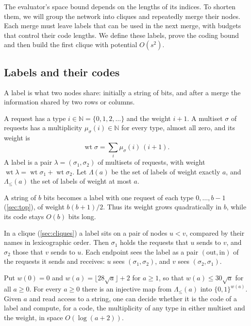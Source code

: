 \documentclass[11pt]{article}
\theoremstyle{definition}
\theoremstyle{definition}
\theoremstyle{remark}
\newcommand{\N}{\mathbb{N}}
\newcommand{\wt}{\operatorname{wt}}
\newcommand{\out}{\mathrm{out}}
\newcommand{\inn}{\mathrm{in}}
\begin{document}
The evaluator's space bound depends on the lengths of its indices. To shorten them, we will group the network into cliques and repeatedly merge their nodes. Each merge must leave labels that can be used in the next merge, with budgets that control their code lengths. We define these labels, prove the coding bound and then build the first clique with potential $O(s^2)$.

\subsection{Labels and their codes}

A label is what two nodes share: initially a string of bits, and after a merge the information shared by two rows or columns.

A request has a type $i\in\N=\{0,1,2,\dots\}$ and the weight $i+1$. A multiset $\sigma$ of requests has a multiplicity $\mu_\sigma(i)\in\N$ for every type, almost all zero, and its weight is
\[
\wt\sigma=\sum_i\mu_\sigma(i)\,(i+1).
\]
A label is a pair $\lambda=(\sigma_1,\sigma_2)$ of multisets of requests, with weight $\wt\lambda=\wt\sigma_1+\wt\sigma_2$. Let $\Lambda(a)$ be the set of labels of weight exactly $a$, and $\Lambda_{\le}(a)$ the set of labels of weight at most $a$.

A string of $b$ bits becomes a label with one request of each type $0,\dots,b-1$ (\cref{sec:top}), of weight $b(b+1)/2$. Thus its weight grows quadratically in $b$, while its code stays $O(b)$ bits long.

In a clique (\cref{sec:cliques}) a label sits on a pair of nodes $u<v$, compared by their names in lexicographic order. Then $\sigma_1$ holds the requests that $u$ sends to $v$, and $\sigma_2$ those that $v$ sends to $u$. Each endpoint sees the label as a pair $(\out,\inn)$ of the requests it sends and receives: $u$ sees $(\sigma_1,\sigma_2)$, and $v$ sees $(\sigma_2,\sigma_1)$.

\begin{lemma}\label{lem:codes}
Put $w(0)=0$ and $w(a)=\lfloor28\sqrt a\rfloor+2$ for $a\ge1$, so that $w(a)\le30\sqrt a$ for all $a\ge0$. For every $a\ge0$ there is an injective map from $\Lambda_{\le}(a)$ into $\{0,1\}^{w(a)}$. Given $a$ and read access to a string, one can decide whether it is the code of a label and compute, for a code, the multiplicity of any type in either multiset and the weight, in space $O(\log(a+2))$.
\end{lemma}
\end{document}
